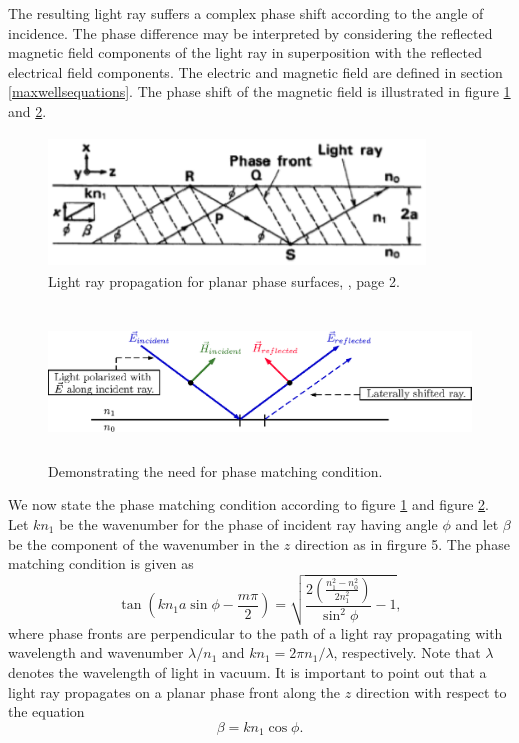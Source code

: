 \documentclass[12pt]{article}
\theoremstyle{definition}
\numberwithin{equation}{section}
\begin{document}
The resulting light ray suffers a complex phase shift according to the angle of incidence. The phase difference may be interpreted by considering the reflected magnetic field components of the light ray in superposition with the reflected electrical field components. The electric and magnetic field are defined in section \ref{maxwellsequations}. The phase shift of the magnetic field is illustrated in figure \ref{figure5} and \ref{figure6}.
\begin{figure}[h!]
\centerline{\includegraphics[height = 35mm, width=100mm, angle=0]{okamoto_fig1_2.eps}}
\caption{Light ray propagation for planar phase surfaces, \cite{Okamoto}, page 2.}
\label{figure5}
\end{figure}
\begin{figure}[h!]
\centerline{\includegraphics[height = 40mm, width=140mm, angle=0]{lightRayPropagation.eps}}
\caption{Demonstrating the need for phase matching condition.}
\label{figure6}
\end{figure}
We now state the phase matching condition according to figure \ref{figure5} and figure \ref{figure6}. Let $kn_1$ be the wavenumber for the phase of incident ray having angle $\phi$ and let $\beta$ be the component of the wavenumber in the $z$ direction as in firgure 5. The phase matching condition is given as 
\begin{equation}
\tan{\left(kn_1a\sin{\phi}-\frac{m\pi}{2}\right)}=\sqrt{\frac{2\left(\frac{n_1^2-n_0^2}{2n_1^2}\right)}{\sin^2{\phi}}-1},
\label{phasematch.eqn}
\end{equation}
where phase fronts are perpendicular to the path of a light ray propagating with wavelength and wavenumber $\lambda\slash n_1$ and $kn_1=2\pi n_1\slash\lambda$, respectively. Note that $\lambda$ denotes the wavelength of light in vacuum. It is important to point out that a light ray propagates on a planar phase front along the $z$ direction with respect to the equation
$$\beta=kn_1\cos{\phi}.$$
\end{document}
